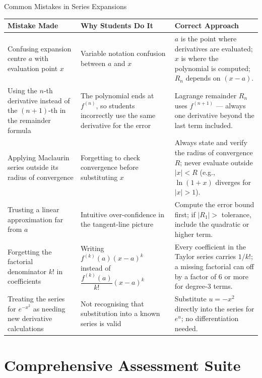 \documentclass[12pt,a4paper]{article}
\begin{document}
\begin{mistakebox}{Common Mistakes in Series Expansions}
\begin{tabular}{>{\raggedright}p{4.5cm} >{\raggedright}p{4cm} p{5.5cm}}
\toprule
\textbf{Mistake Made} & \textbf{Why Students Do It} & \textbf{Correct Approach} \\
\midrule
Confusing expansion centre \(a\) with evaluation point \(x\) &
Variable notation confusion between \(a\) and \(x\) &
\(a\) is the point where derivatives are evaluated; \(x\) is where the polynomial is
computed; \(R_n\) depends on \((x-a)\). \\[6pt]
Using the \(n\)-th derivative instead of the \((n+1)\)-th in the remainder formula &
The polynomial ends at \(f^{(n)}\), so students incorrectly use the same derivative for
the error &
Lagrange remainder \(R_n\) uses \(f^{(n+1)}\) --- always one derivative beyond the last
term included. \\[6pt]
Applying Maclaurin series outside its radius of convergence &
Forgetting to check convergence before substituting \(x\) &
Always state and verify the radius of convergence \(R\); never evaluate outside $|x| < R$
(e.g., \(\ln(1+x)\) diverges for \(|x| > 1\)). \\[6pt]
Trusting a linear approximation far from \(a\) &
Intuitive over-confidence in the tangent-line picture &
Compute the error bound first; if \(|R_1| >\) tolerance, include the quadratic or higher
term. \\[6pt]
Forgetting the factorial denominator \(k!\) in coefficients &
Writing \(f^{(k)}(a)(x-a)^k\) instead of \(\dfrac{f^{(k)}(a)}{k!}(x-a)^k\) &
Every coefficient in the Taylor series carries \(1/k!\); a missing factorial can
off by a factor of 6 or more for degree-3 terms. \\[6pt]
Treating the series for \(e^{-x^2}\) as needing new derivative calculations &
Not recognising that substitution into a known series is valid &
Substitute \(u = -x^2\) directly into the series for \(e^u\); no differentiation
needed. \\
\bottomrule
\end{tabular}
\end{mistakebox}

\section{Comprehensive Assessment Suite}
\end{document}
